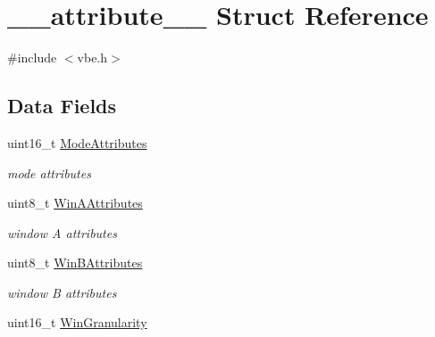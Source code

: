\hypertarget{struct____attribute____}{\section{\-\_\-\-\_\-attribute\-\_\-\-\_\- Struct Reference}
\label{struct____attribute____}
}


{\ttfamily \#include $<$vbe.\-h$>$}

\subsection*{Data Fields}
\begin{DoxyCompactItemize}
\item 
\hypertarget{struct____attribute_____ad7593abf9d201ce5e59de60baba548cd}{uint16\-\_\-t \hyperlink{struct____attribute_____ad7593abf9d201ce5e59de60baba548cd}{Mode\-Attributes}}\label{struct____attribute_____ad7593abf9d201ce5e59de60baba548cd}

\begin{DoxyCompactList}\small\item\em mode attributes \end{DoxyCompactList}\item 
\hypertarget{struct____attribute_____aaa90049ea7f03763acbbf75240f4f5d8}{uint8\-\_\-t \hyperlink{struct____attribute_____aaa90049ea7f03763acbbf75240f4f5d8}{Win\-A\-Attributes}}\label{struct____attribute_____aaa90049ea7f03763acbbf75240f4f5d8}

\begin{DoxyCompactList}\small\item\em window A attributes \end{DoxyCompactList}\item 
\hypertarget{struct____attribute_____a370ddeb84e904ef1000fe57905ebf6b8}{uint8\-\_\-t \hyperlink{struct____attribute_____a370ddeb84e904ef1000fe57905ebf6b8}{Win\-B\-Attributes}}\label{struct____attribute_____a370ddeb84e904ef1000fe57905ebf6b8}

\begin{DoxyCompactList}\small\item\em window B attributes \end{DoxyCompactList}\item 
\hypertarget{struct____attribute_____a38f205f799c6929629395f03e24de077}{uint16\-\_\-t \hyperlink{struct____attribute_____a38f205f799c6929629395f03e24de077}{Win\-Granularity}}\label{struct____attribute_____a38f205f799c6929629395f03e24de077}


\end{DoxyCompactItemize}
